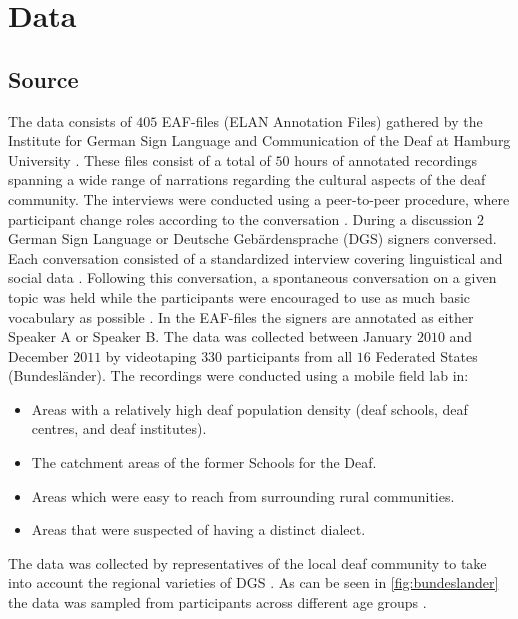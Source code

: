 \section{Data}

\subsection{Source}

The data consists of $405$ EAF-files (ELAN Annotation Files) gathered by the Institute for German Sign Language and Communication of the Deaf at Hamburg University \cite{prillwitz2008dgs}. These files consist of a total of $50$ hours of annotated recordings spanning a wide range of narrations regarding the cultural aspects of the deaf community. The interviews were conducted using a peer-to-peer procedure, where participant change roles according to the conversation \cite{prillwitz2008dgs}. During a discussion $2$ German Sign Language or Deutsche Gebärdensprache (DGS) signers conversed. Each conversation consisted of a standardized interview covering linguistical and social data \cite{deaf_areas}. Following this conversation, a spontaneous conversation on a given topic was held while the participants were encouraged to use as much basic vocabulary as possible \cite{deaf_areas}. In the EAF-files the signers are annotated as either Speaker A or Speaker B. The data was collected between January $2010$ and December $2011$  by videotaping $330$ participants from all $16$ Federated States (Bundesländer). The recordings were conducted using a mobile field lab in:

\begin{itemize}
  \item Areas with a relatively high deaf population density (deaf schools, deaf centres, and deaf institutes). \cite{age_data_hamburg} \cite{deaf_areas}
  \item The catchment areas of the former Schools for the Deaf.\cite{age_data_hamburg} \cite{prillwitz2008dgs}
  \item Areas which were easy to reach from surrounding rural communities. \cite{age_data_hamburg} \cite{deaf_areas}
  \item Areas that were suspected of having a distinct dialect. \cite{age_data_hamburg} \cite{prillwitz2008dgs}
\end{itemize}

 The data was collected by representatives of the local deaf community to take into account the regional varieties of DGS \cite{deaf_areas}. As can be seen in \autoref{fig:bundeslander} the data was sampled from participants across different age groups \cite{age_data_hamburg}. 


